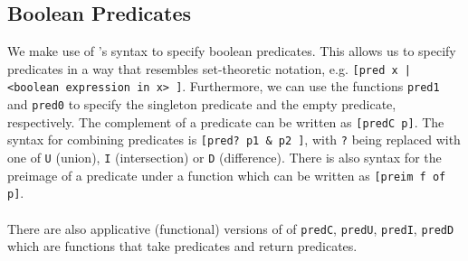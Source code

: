 \subsection{Boolean Predicates}
We make use of \ssreflect's syntax to specify boolean predicates.
This allows us to specify predicates in a way that resembles set-theoretic notation, e.g. 
\lstinline{[pred x | <boolean expression in x> ]}.
Furthermore, we can use the functions \lstinline{pred1} and \lstinline{pred0} to specify the singleton predicate and the empty predicate, respectively.
The complement of a predicate can be written as \lstinline{[predC p]}. 
The syntax for combining predicates is \lstinline{[pred? p1 & p2 ]}, with \lstinline{?} being replaced with one of 
\lstinline{U} (union), \lstinline{I} (intersection) or \lstinline{D} (difference).
There is also syntax for the preimage of a predicate under a function
which can be written as \lstinline{[preim f of p]}.


\paragraph{}
There are also applicative (functional) versions of of \lstinline{predC}, \lstinline{predU}, \lstinline{predI}, \lstinline{predD} which are functions that take predicates and return predicates.

